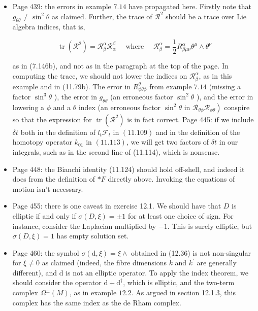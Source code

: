 \documentclass{article}
\begin{document}
\begin{itemize}
\item Page 439: the errors in example $7.14$ have propagated here. Firstly note that $g_{\theta \theta} \neq \sin ^{2} \theta$ as claimed. Further, the trace of $\mathcal{R}^{2}$ should be a trace over Lie algebra indices, that is,

$$
\operatorname{tr}\left(\mathcal{R}^{2}\right)=\mathcal{R}_{\beta}^{\alpha} \mathcal{R}_{\alpha}^{\beta} \quad \text { where } \quad \mathcal{R}_{\beta}^{\alpha}=\frac{1}{2} R_{\beta \mu \nu}^{\alpha} \theta^{\mu} \wedge \theta^{\nu}
$$

as in (7.146b), and not as in the paragraph at the top of the page. In computing the trace, we should not lower the indices on $\mathcal{R}_{\beta}^{\alpha}$, as in this example and in (11.79b). The error in $R_{\phi \theta \phi}^{\theta}$ from example $7.14$ (missing a factor $\sin ^{3} \theta$ ), the error in $g_{\theta \theta}$ (an erroneous factor $\sin ^{2} \theta$ ), and the error in lowering a $\phi$ and a $\theta$ index (an erroneous factor $\sin ^{2} \theta$ in $\left.\mathcal{R}_{\theta \phi} \mathcal{R}_{\phi \theta}\right)$ conspire so that the expression for $\operatorname{tr}\left(\mathcal{R}^{2}\right)$ is in fact correct. Page 445: if we include $\delta t$ both in the definition of $l_{t} \mathcal{F}_{t}$ in $(11.109)$ and in the definition of the homotopy operator $k_{01}$ in $(11.113)$, we will get two factors of $\delta t$ in our integrals, such as in the second line of (11.114), which is nonsense.

\item Page 448: the Bianchi identity (11.124) should hold off-shell, and indeed it does from the definition of $* F$ directly above. Invoking the equations of motion isn't necessary.

\item Page 455: there is one caveat in exercise 12.1. We should have that $D$ is elliptic if and only if $\sigma(D, \xi)=\pm 1$ for at least one choice of sign. For instance, consider the Laplacian multiplied by $-1$. This is surely elliptic, but $\sigma(D, \xi)=1$ has empty solution set.

\item Page 460: the symbol $\sigma(\mathrm{d}, \xi)=\xi \wedge$ obtained in (12.36) is not non-singular for $\xi \neq 0$ as claimed (indeed, the fibre dimensions $k$ and $k^{\prime}$ are generally different), and $\mathrm{d}$ is not an elliptic operator. To apply the index theorem, we should consider the operator $\mathrm{d}+\mathrm{d}^{\dagger}$, which is elliptic, and the two-term complex $\Omega^{\pm}(M)$, as in example $12.2$. As argued in section 12.1.3, this complex has the same index as the de Rham complex.


\end{itemize}
\end{document}
